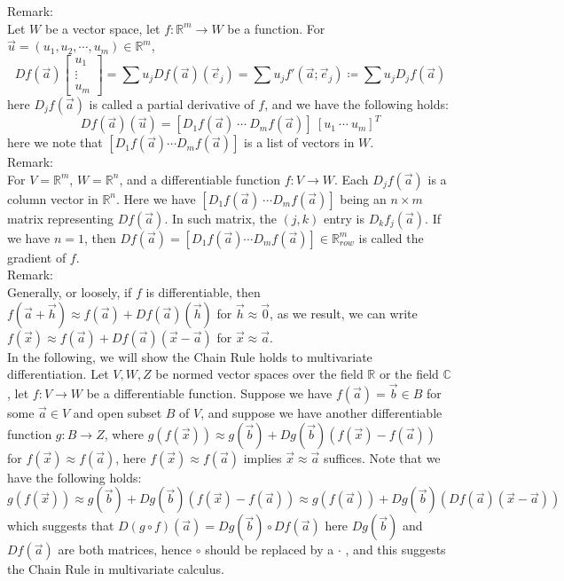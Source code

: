 \documentclass[15pt]{book}
\theoremstyle{break}
\theoremstyle{break}
\newcommand{\R}{\mathbb{R}}
\newcommand{\Complex}{\mathbb{C}}
\newcommand{\remark}{\color{blue}Remark: \color{black}}
\begin{document}
\remark \\
Let $W$ be a vector space, let $f:\R^m \to W$ be a function. For $\vec{u} = (u_1,u_2,\cdots,u_m) \in \R^m$, $$Df(\vec{a})\begin{bmatrix}
u_1\\ \vdots \\ u_m
\end{bmatrix} = \sum u_j Df(\vec{a})(\vec{e}_j) = \sum u_j f'(\vec{a};\vec{e}_j) \coloneqq \sum u_j D_jf(\vec{a})
$$ here $D_jf(\vec{a})$ is called a partial derivative of $f$, and we have the following holds: $$Df(\vec{a})(\vec{u}) = [D_1f(\vec{a})\ \cdots\ D_mf(\vec{a})]\ [u_1\ \cdots\ u_m]^T$$
here we note that $[D_1f(\vec{a})\cdots D_mf(\vec{a})]$ is a list of vectors in $W$.\\

\remark \\
For $V = \R^m$, $W = \R^n$, and a differentiable function $f:V \to W$. Each $D_jf(\vec{a})$ is a column vector in $\R^n$. Here we have $[D_1f(\vec{a})\ \cdots D_mf(\vec{a})]$ being an $n\times m$ matrix representing $Df(\vec{a})$. In such matrix, the $(j,k)$ entry is $D_kf_j(\vec{a})$. If we have $n=1$, then $Df(\vec{a}) = [D_1f(\vec{a})\cdots D_mf(\vec{a})]\in \R_{row}^m$ is called the gradient of $f$.\\

\remark \\
Generally, or loosely, if $f$ is differentiable, then $f(\vec{a}+\vec{h}) \approx f(\vec{a}) + Df(\vec{a})(\vec{h})$ for $\vec{h}\approx \vec{0}$, as we result, we can write $f(\vec{x}) \approx f(\vec{a}) + Df(\vec{a}) (\vec{x}-\vec{a})$ for $\vec{x}\approx \vec{a}$.\\

In the following, we will show the Chain Rule holds to multivariate differentiation. Let $V,W,Z$ be normed vector spaces over the field $\R$ or the field $\Complex$, let $f:V \to W$ be a differentiable function. Suppose we have $f(\vec{a})= \vec{b}\in B$ for some $\vec{a}\in V$ and open subset $B$ of $V$, and suppose we have another differentiable function $g:B \to Z$, where $g(f(\vec{x}))\approx g(\vec{b})+Dg(\vec{b})(f(\vec{x})-f(\vec{a}))$ for $f(\vec{x}) \approx f(\vec{a})$, here $f(\vec{x}) \approx f(\vec{a})$ implies $\vec{x}\approx \vec{a}$ suffices. Note that we have the following holds:$$g(f(\vec{x})) \approx g(\vec{b})+Dg(\vec{b})(f(\vec{x})-f(\vec{a})) \approx g(f(\vec{a}))+Dg(\vec{b})(Df(\vec{a})(\vec{x}-\vec{a}))$$ which suggests that $D(g\circ f)(\vec{a}) = Dg(\vec{b})\circ Df(\vec{a})$ here $Dg(\vec{b})$ and $Df(\vec{a})$ are both matrices, hence $\circ$ should be replaced by a $\cdot$ , and this suggests the Chain Rule in multivariate calculus. \\
\end{document}
